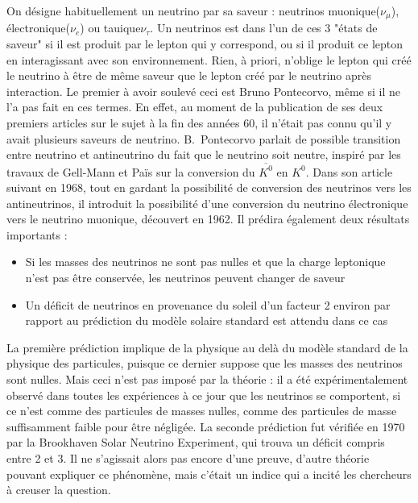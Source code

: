             On désigne habituellement un neutrino par sa saveur : neutrinos muonique($\nu_{\mu}$), électronique($\nu_e$) ou tauique$\nu_{\tau}$. Un neutrinos est dans l'un de ces 3 "états de saveur" si il est produit par le lepton qui y correspond, ou si il produit ce lepton en interagissant avec son environnement. Rien, à priori, n'oblige le lepton qui créé le neutrino à être de même saveur que le lepton créé par le neutrino après interaction. Le premier à avoir soulevé ceci est Bruno Pontecorvo, même si il ne l'a pas fait en ces termes. En effet, au moment de la publication de ses deux premiers articles\cite{Pontecorvo:1957cp,Pontecorvo:1957qd} sur le sujet à la fin des années 60, il n'était pas connu qu'il y avait plusieurs saveurs de neutrino. B.~Pontecorvo parlait de possible transition entre neutrino et antineutrino du fait que le neutrino soit neutre, inspiré par les travaux de Gell-Mann et Païs\cite{Gell-Mann1955} sur la conversion du $\overline{K^0}$ en  $K^0$. Dans son article suivant en 1968\cite{Pontecorvo1968}, tout en gardant la possibilité de conversion des neutrinos vers les antineutrinos, il introduit la possibilité d'une conversion du neutrino électronique vers le neutrino muonique, découvert en 1962\cite{Danby1962}. Il prédira également deux résultats importants :
            \begin{itemize}
                \item Si les masses des neutrinos ne sont pas nulles et que la charge leptonique n'est pas être conservée, les neutrinos peuvent changer de saveur
                \item Un déficit de neutrinos en provenance du soleil d'un facteur 2 environ par rapport au prédiction du modèle solaire standard est attendu dans ce cas
            \end{itemize}
            La première prédiction implique de la physique au delà du modèle standard de la physique des particules, puisque ce dernier suppose que les masses des neutrinos sont nulles. Mais ceci n'est pas imposé par la théorie : il a été expérimentalement observé dans toutes les expériences à ce jour que les neutrinos se comportent, si ce n'est comme des particules de masses nulles, comme des particules de masse suffisamment faible pour être négligée. 
            La seconde prédiction fut vérifiée en 1970 par la Brookhaven Solar Neutrino Experiment\cite{Bahcall1976}, qui trouva un déficit compris entre 2 et 3. Il ne s'agissait alors pas encore d'une preuve, d'autre théorie pouvant expliquer ce phénomène, mais c'était un indice qui a incité les chercheurs à creuser la question.
            
